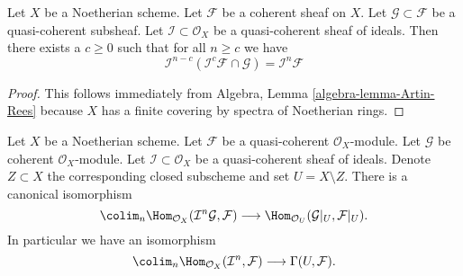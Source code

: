 \begin{lemma}
\label{lemma-Artin-Rees}
Let $X$ be a Noetherian scheme.
Let $\mathcal{F}$ be a coherent sheaf on $X$.
Let $\mathcal{G} \subset \mathcal{F}$ be a quasi-coherent subsheaf.
Let $\mathcal{I} \subset \mathcal{O}_X$ be a quasi-coherent sheaf of
ideals.
Then there exists a $c \geq 0$ such that for all $n \geq c$ we
have
$$
\mathcal{I}^{n - c}(\mathcal{I}^c\mathcal{F} \cap \mathcal{G})
=
\mathcal{I}^n\mathcal{F}
$$
\end{lemma}

\begin{proof}
This follows immediately from
Algebra, Lemma \ref{algebra-lemma-Artin-Rees}
because $X$ has a finite covering by spectra of Noetherian rings.
\end{proof}

\begin{lemma}
\label{lemma-homs-over-open}
Let $X$ be a Noetherian scheme.
Let $\mathcal{F}$ be a quasi-coherent $\mathcal{O}_X$-module.
Let $\mathcal{G}$ be coherent $\mathcal{O}_X$-module.
Let $\mathcal{I} \subset \mathcal{O}_X$ be a quasi-coherent sheaf of
ideals. Denote $Z \subset X$ the corresponding closed subscheme and
set $U = X \setminus Z$.
There is a canonical isomorphism
$$
\colim_n \Hom_{\mathcal{O}_X}(\mathcal{I}^n\mathcal{G}, \mathcal{F})
\longrightarrow
\Hom_{\mathcal{O}_U}(\mathcal{G}|_U, \mathcal{F}|_U).
$$
In particular we have an isomorphism
$$
\colim_n \Hom_{\mathcal{O}_X}(
\mathcal{I}^n, \mathcal{F})
\longrightarrow
\Gamma(U, \mathcal{F}).
$$
\end{lemma}

